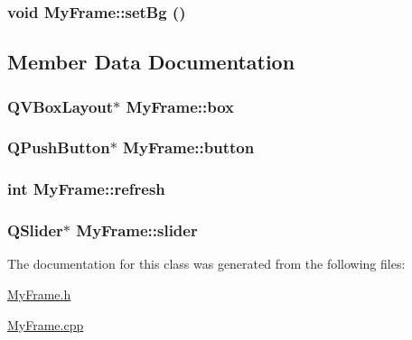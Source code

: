 \hypertarget{class_my_frame_90c2f37cdefddf0f871a31a5ea17f0f8}{
\subsubsection[{setBg}]{\setlength{\rightskip}{0pt plus 5cm}void MyFrame::setBg ()}}
\label{class_my_frame_90c2f37cdefddf0f871a31a5ea17f0f8}




\subsection{Member Data Documentation}
\hypertarget{class_my_frame_c0c0dbb5009083ec1f00b3595c54f490}{
\subsubsection[{box}]{\setlength{\rightskip}{0pt plus 5cm}QVBoxLayout$\ast$ {\bf MyFrame::box}}}
\label{class_my_frame_c0c0dbb5009083ec1f00b3595c54f490}


\hypertarget{class_my_frame_9e4e5884b8e72cb0e43de1cab71a55fe}{
\subsubsection[{button}]{\setlength{\rightskip}{0pt plus 5cm}QPushButton$\ast$ {\bf MyFrame::button}}}
\label{class_my_frame_9e4e5884b8e72cb0e43de1cab71a55fe}


\hypertarget{class_my_frame_a8071d89f7cafe590b2ea64a99e97d02}{
\subsubsection[{refresh}]{\setlength{\rightskip}{0pt plus 5cm}int {\bf MyFrame::refresh}}}
\label{class_my_frame_a8071d89f7cafe590b2ea64a99e97d02}


\hypertarget{class_my_frame_444e1de1ef9830b53a6dce407b388d37}{
\subsubsection[{slider}]{\setlength{\rightskip}{0pt plus 5cm}QSlider$\ast$ {\bf MyFrame::slider}}}
\label{class_my_frame_444e1de1ef9830b53a6dce407b388d37}




The documentation for this class was generated from the following files:\begin{CompactItemize}
\item 
\hyperlink{_my_frame_8h}{MyFrame.h}\item 
\hyperlink{_my_frame_8cpp}{MyFrame.cpp}\end{CompactItemize}
